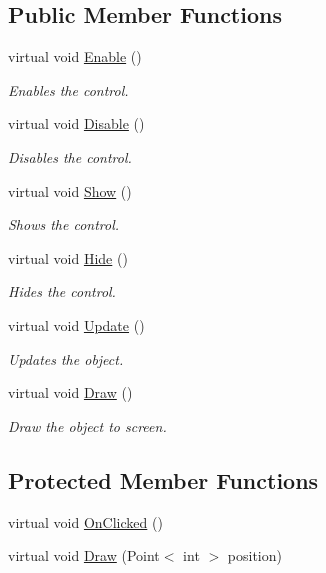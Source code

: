 \subsection*{Public Member Functions}
\begin{DoxyCompactItemize}
\item 
virtual void \hyperlink{class_tri_devs_1_1_tri_engine_1_1_u_i_1_1_control_a595f9bf7a320239c99bce5fa8d8be5ac}{Enable} ()
\begin{DoxyCompactList}\small\item\em Enables the control. \end{DoxyCompactList}\item 
virtual void \hyperlink{class_tri_devs_1_1_tri_engine_1_1_u_i_1_1_control_a3272967766f5e745e5d28df745993d4e}{Disable} ()
\begin{DoxyCompactList}\small\item\em Disables the control. \end{DoxyCompactList}\item 
virtual void \hyperlink{class_tri_devs_1_1_tri_engine_1_1_u_i_1_1_control_a71f5fe5d595f95b65eeec549720d5106}{Show} ()
\begin{DoxyCompactList}\small\item\em Shows the control. \end{DoxyCompactList}\item 
virtual void \hyperlink{class_tri_devs_1_1_tri_engine_1_1_u_i_1_1_control_af4021c1063ad158b41504670d2eda21f}{Hide} ()
\begin{DoxyCompactList}\small\item\em Hides the control. \end{DoxyCompactList}\item 
virtual void \hyperlink{class_tri_devs_1_1_tri_engine_1_1_u_i_1_1_control_aa399f06ef6bd7bfe088fb2b5426534f2}{Update} ()
\begin{DoxyCompactList}\small\item\em Updates the object. \end{DoxyCompactList}\item 
virtual void \hyperlink{class_tri_devs_1_1_tri_engine_1_1_u_i_1_1_control_a38b32c6a0ac2c53469149b298fbcd8cf}{Draw} ()
\begin{DoxyCompactList}\small\item\em Draw the object to screen. \end{DoxyCompactList}\end{DoxyCompactItemize}
\subsection*{Protected Member Functions}
\begin{DoxyCompactItemize}
\item 
virtual void \hyperlink{class_tri_devs_1_1_tri_engine_1_1_u_i_1_1_control_a7b320763bc664738c1a51fc2aaed4f41}{On\-Clicked} ()
\item 
virtual void \hyperlink{class_tri_devs_1_1_tri_engine_1_1_u_i_1_1_control_a1326e6737b2c1d1ea5d9fcc0b9a52e37}{Draw} (Point$<$ int $>$ position)
\end{DoxyCompactItemize}
